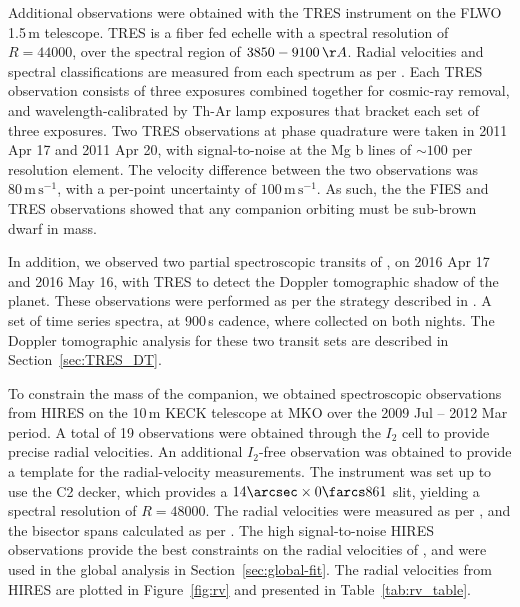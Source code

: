 \documentclass[apjl]{emulateapj}
\begin{document}
Additional observations were obtained with the TRES instrument \citep{Furesz:2008} on the FLWO 1.5\,m telescope. TRES is a fiber fed echelle with a spectral resolution of $R = 44000$, over the spectral region of $3850-9100\,\AA$. Radial velocities and spectral classifications are measured from each spectrum as per \citet{Buchave:2012}. Each TRES observation consists of three exposures combined together for cosmic-ray removal, and wavelength-calibrated by Th-Ar lamp exposures that bracket each set of three exposures. Two TRES observations at phase quadrature were taken in 2011 Apr 17 and 2011 Apr 20, with signal-to-noise at the Mg b lines of $\sim 100$ per resolution element. The velocity difference between the two observations was $80\,\mathrm{m\,s}^{-1}$, with a per-point uncertainty of $100\,\mathrm{m\,s}^{-1}$. As such, the the FIES and TRES observations showed that any companion orbiting \hatcur{} must be sub-brown dwarf in mass. 

In addition, we observed two partial spectroscopic transits of \hatcurb{}, on 2016 Apr 17 and 2016 May 16, with TRES to detect the Doppler tomographic shadow of the planet. These observations were performed as per the strategy described in \citet{Zhou:2016}. A set of time series spectra, at 900\,s cadence, where collected on both nights. The Doppler tomographic analysis for these two transit sets are described in Section~\ref{sec:TRES_DT}. 

To constrain the mass of the companion, we obtained spectroscopic observations from HIRES on the 10\,m KECK telescope \citep{1994SPIE.2198..362V} at MKO over the 2009 Jul -- 2012 Mar period. A total of 19 observations were obtained through the $I_2$ cell to provide precise radial velocities. An additional $I_2$-free observation was obtained to provide a template for the radial-velocity measurements. The instrument was set up to use the C2 decker, which provides a $14\arcsec \times 0\farcs 861$ slit, yielding a spectral resolution of $R=48000$. The radial velocities were measured as per \citet{1996PASP..108..500B}, and the bisector spans calculated as per \citet{2007ApJ...666L.121T}. The high signal-to-noise HIRES observations provide the best constraints on the radial velocities of \hatcur{}, and were used in the global analysis in Section~\ref{sec:global-fit}. The radial velocities from HIRES are plotted in Figure~\ref{fig:rv} and presented in Table~\ref{tab:rv_table}. 
\end{document}
